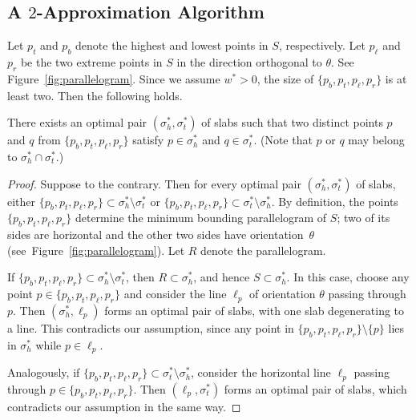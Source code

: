 \documentclass[english,a4paper, cleveref, autoref, thm-restate, nolineno]{socg-lipics-v2021}
\theoremstyle{star}
\theoremstyle{claimstar}
\begin{document}
\subsection{A \texorpdfstring{$2$}{2}-Approximation Algorithm}
\label{sec:2_apx_two_fixed}

Let $p_t$ and $p_b$ denote the highest and lowest points in $S$, respectively.
Let $p_\ell$ and $p_r$ be the two extreme points in $S$ in the direction orthogonal to $\theta$. See Figure~\ref{fig:parallelogram}. 
Since we assume $w^* > 0$, the size of $\{p_b, p_t, p_\ell, p_r\}$ is at least two.
Then the following holds.


\begin{lemma}
    \label{lem:two_fixed_extreme_pts}
    There exists an optimal pair $(\sigma_h^*, \sigma_t^*)$ of slabs such that two distinct points $p$ and $q$ from $\{p_b, p_t, p_\ell, p_r\}$ satisfy $p \in \sigma_h^*$ and $q \in \sigma_t^*$.
    (Note that $p$ or $q$ may belong to $\sigma_h^* \cap \sigma_t^*$.)
\end{lemma}
\begin{proof}
    Suppose to the contrary. 
    Then for every optimal pair $(\sigma_h^*, \sigma_t^*)$ of slabs, either $\{p_b, p_t, p_\ell, p_r\} \subset \sigma_h^* \setminus \sigma_t^*$ or $\{p_b, p_t, p_\ell, p_r\} \subset \sigma_t^* \setminus \sigma_h^*$.
    By definition, the points $\{p_b, p_t, p_\ell, p_r\}$ determine the minimum bounding parallelogram of $S$; two of its sides are horizontal and the other two sides have orientation~$\theta$ (see~Figure~\ref{fig:parallelogram}). 
    Let $R$ denote the parallelogram. 
    
    If $\{p_b, p_t, p_\ell, p_r\} \subset \sigma_h^* \setminus \sigma_t^*$, then $R \subset \sigma_h^*$, and hence $S \subset \sigma_h^*$.
    In this case, choose any point $p \in \{p_b, p_t, p_\ell, p_r\}$ and consider the line $\ell_p$ of orientation $\theta$ passing through $p$. 
    Then $(\sigma_h^*, \ell_p)$ forms an optimal pair of slabs, with one slab degenerating to a line.
    This contradicts our assumption, since any point in $\{p_b, p_t, p_\ell, p_r\}\setminus\{p\}$ lies in $\sigma_h^*$ while $p \in \ell_p$.
    
    Analogously, if $\{p_b, p_t, p_\ell, p_r\} \subset \sigma_t^* \setminus \sigma_h^*$, consider the horizontal line $\ell_p$ passing through $p \in \{p_b, p_t, p_\ell, p_r\}$.
    Then $(\ell_p, \sigma_t^*)$ forms an optimal pair of slabs, which contradicts our assumption in the same way.
\end{proof}
\end{document}
